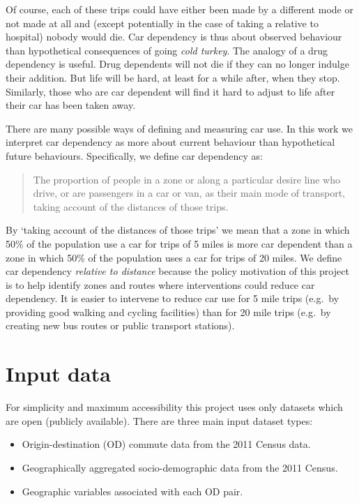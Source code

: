 \documentclass[]{article}
\providecommand{\tightlist}{%
  \setlength{\itemsep}{0pt}\setlength{\parskip}{0pt}}
\begin{document}
Of course, each of these trips could have either been made by a
different mode or not made at all and (except potentially in the case of
taking a relative to hospital) nobody would die. Car dependency is thus
about observed behaviour than hypothetical consequences of going
\emph{cold turkey}. The analogy of a drug dependency is useful. Drug
dependents will not die if they can no longer indulge their addition.
But life will be hard, at least for a while after, when they stop.
Similarly, those who are car dependent will find it hard to adjust to
life after their car has been taken away.

There are many possible ways of defining and measuring car use. In this
work we interpret car dependency as more about current behaviour than
hypothetical future behaviours. Specifically, we define car dependency
as:

\begin{quote}
The proportion of people in a zone or along a particular desire line who
drive, or are passengers in a car or van, as their main mode of
transport, taking account of the distances of those trips.
\end{quote}

By `taking account of the distances of those trips' we mean that a zone
in which 50\% of the population use a car for trips of 5 miles is more
car dependent than a zone in which 50\% of the population uses a car for
trips of 20 miles. We define car dependency \emph{relative to distance}
because the policy motivation of this project is to help identify zones
and routes where interventions could reduce car dependency. It is easier
to intervene to reduce car use for 5 mile trips (e.g.~by providing good
walking and cycling facilities) than for 20 mile trips (e.g.~by creating
new bus routes or public transport stations).

\section{Input data}\label{input-data}

For simplicity and maximum accessibility this project uses only datasets
which are open (publicly available). There are three main input dataset
types:

\begin{itemize}
\tightlist
\item
  Origin-destination (OD) commute data from the 2011 Census data.
\item
  Geographically aggregated socio-demographic data from the 2011 Census.
\item
  Geographic variables associated with each OD pair.
\end{itemize}
\end{document}
